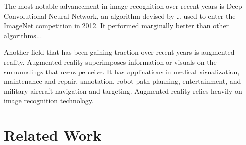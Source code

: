 \documentclass[letterpaper]{article} %
\begin{document}
The most notable advancement in image recognition over recent years is Deep Convolutional Neural Network, an algorithm devised by … used to enter the ImageNet competition in 2012. It performed marginally better than other algorithms...

Another field that has been gaining traction over recent years is augmented reality. Augmented reality superimposes information or visuals on the surroundings that users perceive. It has applications in medical visualization, maintenance and repair, annotation, robot path planning, entertainment, and military aircraft navigation and targeting. Augmented reality relies heavily on image recognition technology.





\section{Related Work}
\end{document}
